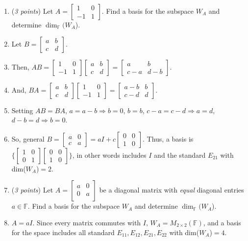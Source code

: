 \documentclass[11pt]{article}
\newcommand{\bbF}{\mathbb{F}}
\theoremstyle{definition}
\numberwithin{equation}{subsection}
\begin{document}
\begin{enumerate}
\begin{enumerate}
\item (\emph{3 points}) Let $A=\begin{bmatrix} 1 & 0\\ -1 & 1\end{bmatrix}$. Find a basis for the subspace $W_A$ and determine $\dim_{\bbF}(W_A$).
\item[] Let $B=\begin{bmatrix}a&b\\c&d\end{bmatrix}$.
\item[] Then, $AB=\begin{bmatrix}1&0\\-1&1\end{bmatrix}\begin{bmatrix}a&b\\c&d\end{bmatrix}=\begin{bmatrix}a&b\\c-a&d-b\end{bmatrix}$.
\item[] And, $BA=\begin{bmatrix}a&b\\c&d\end{bmatrix}\begin{bmatrix}1&0\\-1&1\end{bmatrix}=\begin{bmatrix}a-b&b\\c-d&d\end{bmatrix}$.
\item[] Setting $AB=BA$, $a=a-b\Rightarrow b=0$, $b=b$, $c-a=c-d\Rightarrow a=d$, $d-b=d\Rightarrow b=0$.
\item[] So, general $B=\begin{bmatrix}a&0\\c&a\end{bmatrix}=aI+c\begin{bmatrix}0&0\\1&0\end{bmatrix}$. Thus, a basis is $\{\begin{bmatrix}1&0\\0&1\end{bmatrix}\begin{bmatrix}0&0\\1&0\end{bmatrix}\}$, in other words includes $I$ and the standard $E_{21}$ with dim($W_A$)$=2$.

\item (\emph{3 points}) Let $A=\begin{bmatrix} a & 0\\ 0 & a\\\end{bmatrix}$ be a diagonal matrix with \emph{equal} diagonal entries $a \in\mathbb{F}$. Find a basis for the subspace $W_A$ and determine $\dim_{\bbF}(W_A$).
\item[] $A=aI$. Since every matrix commutes with $I$, $W_A=M_{2\times 2}(\bbF)$, and a basis for the space includes all standard $E_{11},E_{12},E_{21},E_{22}$ with dim($W_A$)$=4$.


\end{enumerate}
\end{enumerate}
\end{document}
